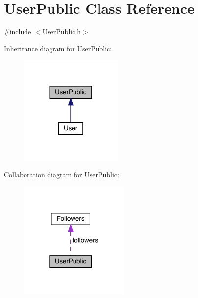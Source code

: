 \hypertarget{class_user_public}{}\section{User\+Public Class Reference}
\label{class_user_public}


{\ttfamily \#include $<$User\+Public.\+h$>$}



Inheritance diagram for User\+Public\+:
\nopagebreak
\begin{figure}[H]
\begin{center}
\leavevmode
\includegraphics[width=144pt]{class_user_public__inherit__graph}
\end{center}
\end{figure}


Collaboration diagram for User\+Public\+:
\nopagebreak
\begin{figure}[H]
\begin{center}
\leavevmode
\includegraphics[width=154pt]{class_user_public__coll__graph}
\end{center}
\end{figure}
